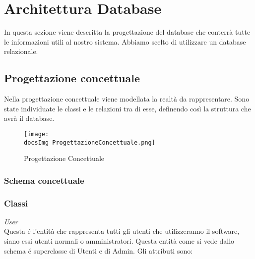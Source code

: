 \section{Architettura Database}{
	In questa sezione viene descritta la progettazione del database che conterrà tutte le informazioni utili al nostro sistema. Abbiamo scelto di utilizzare un database relazionale.
	
	\subsection{Progettazione concettuale}{
		Nella progettazione concettuale viene modellata la realtà da rappresentare. Sono state individuate le classi e le relazioni tra di esse, definendo così la struttura che avrà il database.
		
		\begin{figure}[H]
				\texttt{[image: \\docsImg ProgettazioneConcettuale.png]}
				\caption{Progettazione Concettuale}
				\label{Fig. Progettazione Concettuale}
		\end{figure}
			
			\subsubsection{Schema concettuale}
			
			\subsubsection{Classi}
			\textit{User}\\
			Questa é l'entità che rappresenta tutti gli utenti che utilizzeranno il software, siano essi utenti normali o amministratori. Questa entità come si vede dallo schema é superclasse di Utenti e di Admin. Gli attributi sono: 
			\begin{center}
			\begin{table}[H]
			\caption{Entità User}
			\label{EU}
			\end{table}
			\end{center}
		
}}
